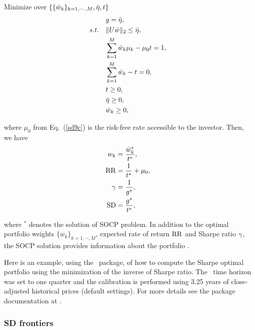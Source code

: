 \bigskip
\noindent Minimize over $\{ \{ {\bar w}_k \}_{k=1,\cdots,M}, {\bar \eta}, t \}$
\begin{subequations}\label{sd9}
\begin{align}
    & g = \bbeta, \label{sd9a} \\
    \st & \| U \bw \|_2 \leq \bbeta, \label{sd9b} \\
        & \sum_{k=1}^M \bw_k \mu_k - \mu_0 t = 1, \label{sd9c} \\
        & \sum_{k=1}^M \bw_k - t = 0, \label{sd9d} \\
        & t \geq 0, \label{sd9f} \\
        & \bbeta \geq 0, \label{sd9g} \\
        & \bw_k \geq 0, \label{sd9e}
\end{align}
\end{subequations}

\noindent where $\mu_0$ from Eq.~(\ref{sd9c}) is the risk-free rate accessible to the investor.
Then, we have
\begin{subequations}\label{sd10}
\begin{align}
    w_k &= \frac{\bw_k^*}{t^*}, \label{sd10a} \\
    \RR &= \frac{1}{t^*} + \mu_0, \label{sd10c} \\
    \Sharpe &= \frac{1}{g^*}, \label{sd10b} \\
    \SD &= \frac{g^*}{t^*}, \label{sd10d}
\end{align}
\end{subequations}

\noindent where $^*$ denotes the solution of SOCP problem.
In addition to the optimal portfolio weights $\{w_k\}_{k=1,\cdots,M}$, expected rate of return ${\rm RR}$ and
Sharpe ratio ${\gamma}$,
the SOCP solution provides information about the portfolio \SD.

\bigskip
\noindent Here is an example, using the \azapy\ package, of how to compute the Sharpe optimal portfolio using the minimization
of the inverse of Sharpe ratio.
The \SD\ time horizon was set to one quarter and the calibration is performed using 3.25 years of
close-adjusted historical prices (default settings).
For more details see the package documentation at \azapydoc.



\BackToContents

\subsubsection{SD frontiers}

